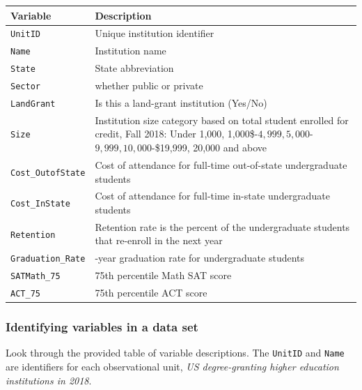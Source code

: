 \documentclass[
]{report}
\newcounter{none} %
\begin{document}
{\def\LTcaptype{none} %
\begin{longtable}[]{@{}
  >{\raggedright\arraybackslash}p{}
  >{\raggedright\arraybackslash}p{}@{}}
\toprule\noalign{}
\begin{minipage}[b]{\linewidth}\raggedright
\textbf{Variable}
\end{minipage} & \begin{minipage}[b]{\linewidth}\raggedright
\textbf{Description}
\end{minipage} \\
\midrule\noalign{}
\endhead
\bottomrule\noalign{}
\endlastfoot
\texttt{UnitID} & Unique institution identifier \\
\texttt{Name} & Institution name \\
\texttt{State} & State abbreviation \\
\texttt{Sector} & whether public or private \\
\texttt{LandGrant} & Is this a land-grant institution (Yes/No) \\
\texttt{Size} & Institution size category based on total student enrolled for credit, Fall 2018: Under 1,000, 1,000\$-\(4,999, 5,000\)-\(9,999, 10,000\)-\$19,999, 20,000 and above \\
\texttt{Cost\_OutofState} & Cost of attendance for full-time out-of-state undergraduate students \\
\texttt{Cost\_InState} & Cost of attendance for full-time in-state undergraduate students \\
\texttt{Retention} & Retention rate is the percent of the undergraduate students that re-enroll in the next year \\
\texttt{Graduation\_Rate} & 6-year graduation rate for undergraduate students \\
\texttt{SATMath\_75} & 75th percentile Math SAT score \\
\texttt{ACT\_75} & 75th percentile ACT score \\
\end{longtable}
}

\subsubsection*{Identifying variables in a data set}\label{identifying-variables-in-a-data-set}

Look through the provided table of variable descriptions. The \texttt{UnitID} and \texttt{Name} are identifiers for each observational unit, \emph{US degree-granting higher education institutions in 2018}.
\end{document}
